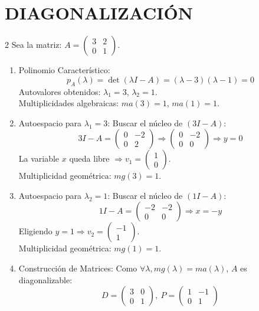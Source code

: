 \documentclass[10pt]{extarticle}
\begin{document}
\section*{DIAGONALIZACIÓN}
\begin{multicols}{2}
Sea la matriz: $A = \begin{pmatrix}3&2\\0&1\end{pmatrix}$.

\begin{enumerate}
\item Polinomio Característico:
$$p_A(\lambda) = \det(\lambda I - A) = (\lambda-3)(\lambda-1) = 0$$
Autovalores obtenidos: $\lambda_1=3$, $\lambda_2=1$. \\
Multiplicidades algebraicas: $ma(3)=1$, $ma(1)=1$.

\item Autoespacio para $\lambda_1=3$: Buscar el núcleo de $(3I-A)$:
$$3I-A=\begin{pmatrix}0&-2\\0&2\end{pmatrix} \Rightarrow \begin{pmatrix}0&-2\\0&0\end{pmatrix} \Rightarrow y=0$$
La variable $x$ queda libre $\Rightarrow v_1=\begin{pmatrix}1\\0\end{pmatrix}$. \\
Multiplicidad geométrica: $mg(3)=1$.

\item Autoespacio para $\lambda_2=1$: Buscar el núcleo de $(1I-A)$:
$$1I-A=\begin{pmatrix}-2&-2\\0&0\end{pmatrix} \Rightarrow x=-y$$
Eligiendo $y=1 \Rightarrow v_2=\begin{pmatrix}-1\\1\end{pmatrix}$. \\
Multiplicidad geométrica: $mg(1)=1$.

\item Construcción de Matrices: Como $\forall\lambda, mg(\lambda)=ma(\lambda)$, $A$ es diagonalizable:
$$D=\begin{pmatrix}3&0\\0&1\end{pmatrix},\ P=\begin{pmatrix}1&-1\\0&1\end{pmatrix}$$


\end{enumerate}
\end{multicols}
\end{document}
